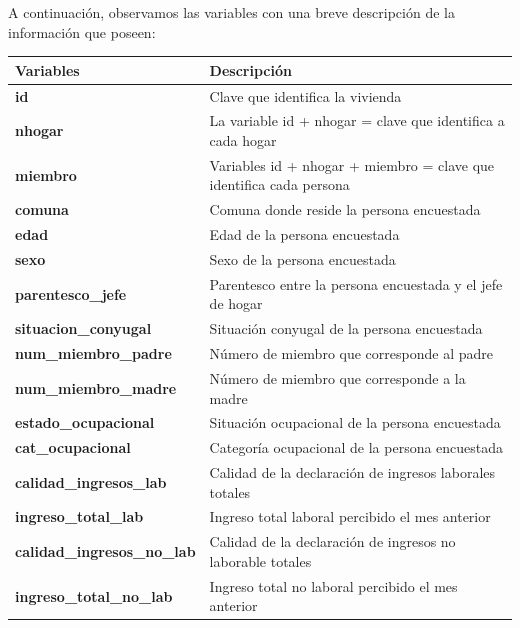 \documentclass[a4paper]{article}
\begin{document}
     A continuación, observamos las variables con una breve descripción de la información que poseen:
    \begin{table}[H]
    \begin{tabular}{|l|l|}
        \hline
        \textbf{Variables}                     & \textbf{Descripción} \\ \hline
        \textbf{id}                            & Clave que identifica la vivienda \\ \hline
        \textbf{nhogar}                        & La variable id + nhogar = clave que identifica a cada hogar \\ \hline
        \textbf{miembro}                       & Variables id + nhogar + miembro = clave que identifica  cada persona \\ \hline
        \textbf{comuna}                        & Comuna donde reside la persona encuestada \\ \hline
        \textbf{edad}                          & Edad de la persona encuestada \\ \hline
        \textbf{sexo}                          & Sexo de la persona encuestada \\ \hline
        \textbf{parentesco\_jefe}              & Parentesco entre la persona encuestada y el jefe de hogar \\ \hline
        \textbf{situacion\_conyugal}           & Situación conyugal de la persona encuestada \\ \hline
        \textbf{num\_miembro\_padre}           & Número de miembro que corresponde al padre \\ \hline
        \textbf{num\_miembro\_madre}           & Número de miembro que corresponde a la madre \\ \hline
        \textbf{estado\_ocupacional}           & Situación ocupacional de la persona encuestada \\ \hline
        \textbf{cat\_ocupacional}              & Categoría ocupacional de la persona encuestada \\ \hline
        \textbf{calidad\_ingresos\_lab}        & Calidad de la declaración de ingresos laborales totales \\ \hline
        \textbf{ingreso\_total\_lab}           & Ingreso total laboral percibido el mes anterior \\ \hline
        \textbf{calidad\_ingresos\_no\_lab}    & Calidad de la declaración de ingresos no laborable totales \\ \hline
        \textbf{ingreso\_total\_no\_lab}       & Ingreso total no laboral percibido el mes anterior \\ \hline

\end{tabular}
\end{table}
\end{document}
